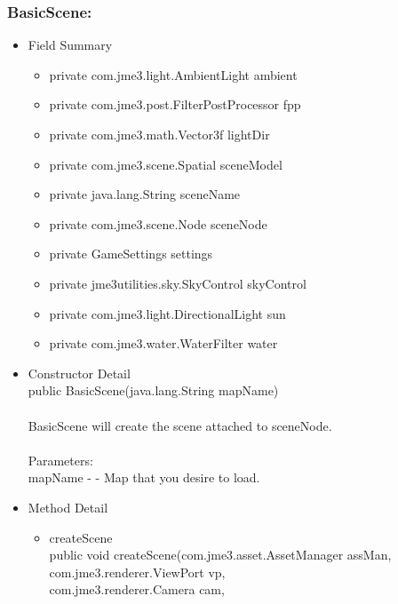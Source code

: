 \documentclass[letterpaper]{article}
\begin{document}
				\vspace{0.2in}
				\subsubsection*{BasicScene:}
				\vspace{0.1in}
					\begin{itemize}
						\item	Field Summary
								\begin{itemize}
									\item	private com.jme3.light.AmbientLight	ambient
									\item	private com.jme3.post.FilterPostProcessor	fpp
									\item	private com.jme3.math.Vector3f	lightDir
									\item	private com.jme3.scene.Spatial	sceneModel
									\item	private java.lang.String	sceneName
									\item	private com.jme3.scene.Node	sceneNode
									\item	private GameSettings	settings
									\item	private jme3utilities.sky.SkyControl	skyControl
									\item	private com.jme3.light.DirectionalLight	sun
									\item	private com.jme3.water.WaterFilter	water
								\end{itemize}
						\item	Constructor Detail \\
								public BasicScene(java.lang.String mapName) \\ \\
								BasicScene will create the scene attached to sceneNode. \\ \\
								Parameters: \\
								mapName - - Map that you desire to load.
						\item	Method Detail
								\begin{itemize}
									\item	createScene \\
											public void createScene(com.jme3.asset.AssetManager assMan, \\
		               com.jme3.renderer.ViewPort vp, \\
		               com.jme3.renderer.Camera cam, \\

\end{itemize}
\end{itemize}
\end{document}
